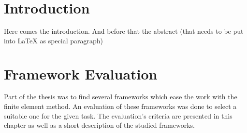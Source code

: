 \documentclass[11pt,twoside]{scrartcl}
\begin{document}
\Coverpage
\tableofcontents
\section{Introduction}
Here comes the introduction. And before that the abstract (that needs to be put into LaTeX as special paragraph)\newpage %
\section{Framework Evaluation}
Part of the thesis was to find several frameworks which ease the work with the finite element method. An evaluation of these frameworks was done to select a suitable one for the given task. The evaluation's criteria are presented in this chapter as well as a short description of the studied frameworks.
\end{document}
